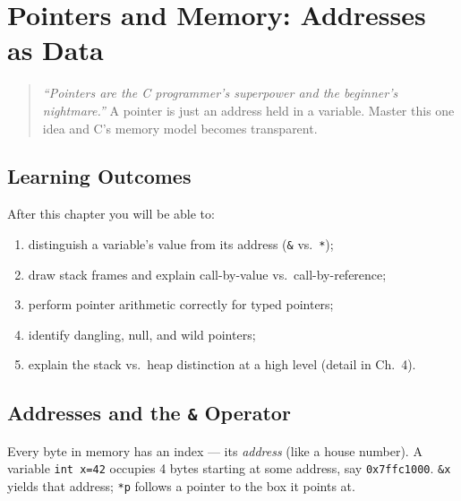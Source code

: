 \chapter{Pointers and Memory: Addresses as Data}
\label{ch:pointers-memory}

\begin{quote}
\emph{``Pointers are the C programmer's superpower and the beginner's nightmare.''} A pointer is just an address held in a variable. Master this one idea and C's memory model becomes transparent.
\end{quote}

\noindent{}

\section*{Learning Outcomes}
After this chapter you will be able to:
\begin{enumerate}[label=(L\arabic*)]
    \item distinguish a variable's value from its address (\texttt{\&} vs.\ \texttt{*});
    \item draw stack frames and explain call-by-value vs.\ call-by-reference;
    \item perform pointer arithmetic correctly for typed pointers;
    \item identify dangling, null, and wild pointers;
    \item explain the stack vs.\ heap distinction at a high level (detail in Ch.~4).
\end{enumerate}

\section{Addresses and the \texttt{\&} Operator}
\label{sec:addresses}
Every byte in memory has an index --- its \emph{address} (like a house number). A variable \texttt{int x=42} occupies 4 bytes starting at some address, say \texttt{0x7ffc1000}. \texttt{\&x} yields that address; \texttt{*p} follows a pointer to the box it points at.

